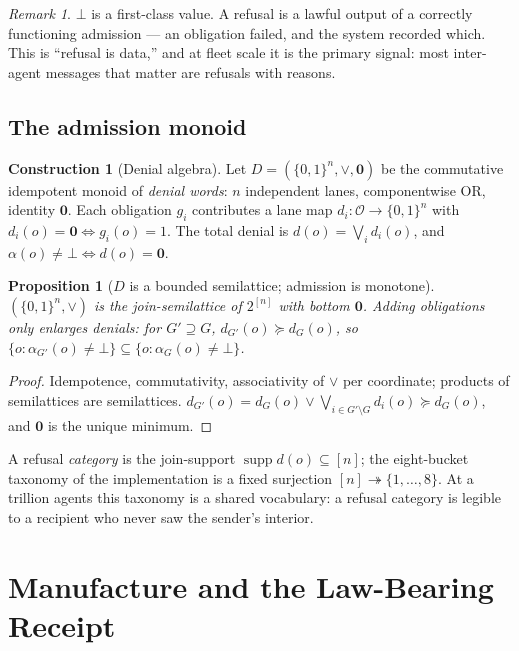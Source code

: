\documentclass[11pt,oneside]{book}
\theoremstyle{definition}
\newtheorem{construction}{Construction}[chapter]
\theoremstyle{plain}
\newtheorem{proposition}[theorem]{Proposition}
\theoremstyle{remark}
\newtheorem*{remark}{Remark}
\newcommand{\Obs}{\mathcal{O}}                 %
\newcommand{\adm}{\alpha}                      %
\newcommand{\Rfsl}{\bot}                       %
\DeclareMathOperator{\supp}{supp}
\begin{document}
\begin{remark}
$\Rfsl$ is a first-class value. A refusal is a lawful output of a correctly functioning
admission --- an obligation failed, and the system recorded which. This is ``refusal is
data,'' and at fleet scale it is the primary signal: most inter-agent messages that matter
are refusals with reasons.
\end{remark}

\section{The admission monoid}

\begin{construction}[Denial algebra]\label{con:denial}
Let $D=(\{0,1\}^n,\lor,\bm 0)$ be the commutative idempotent monoid of \emph{denial words}:
$n$ independent lanes, componentwise OR, identity $\bm 0$. Each obligation $g_i$ contributes
a lane map $d_i:\Obs\to\{0,1\}^n$ with $d_i(o)=\bm 0\iff g_i(o)=1$. The total denial is
$d(o)=\bigvee_i d_i(o)$, and $\adm(o)\ne\Rfsl\iff d(o)=\bm 0$.
\end{construction}

\begin{proposition}[$D$ is a bounded semilattice; admission is monotone]\label{prop:semilattice}
$(\{0,1\}^n,\lor)$ is the join-semilattice of $2^{[n]}$ with bottom $\bm 0$. Adding
obligations only enlarges denials: for $G'\supseteq G$, $d_{G'}(o)\succeq d_G(o)$, so
$\{o:\adm_{G'}(o)\ne\Rfsl\}\subseteq\{o:\adm_G(o)\ne\Rfsl\}$.
\end{proposition}

\begin{proof}
Idempotence, commutativity, associativity of $\lor$ per coordinate; products of
semilattices are semilattices. $d_{G'}(o)=d_G(o)\lor\bigvee_{i\in G'\setminus G}d_i(o)
\succeq d_G(o)$, and $\bm 0$ is the unique minimum. \end{proof}

A refusal \emph{category} is the join-support $\supp d(o)\subseteq[n]$; the eight-bucket
taxonomy of the implementation is a fixed surjection $[n]\twoheadrightarrow\{1,\dots,8\}$.
At a trillion agents this taxonomy is a shared vocabulary: a refusal category is legible to
a recipient who never saw the sender's interior.

\chapter{Manufacture and the Law-Bearing Receipt}
\label{ch:mu}
\end{document}
